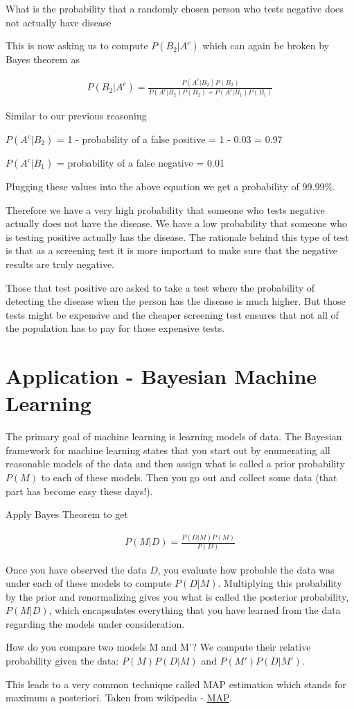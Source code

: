 \documentclass[12pt]{article}
\begin{document}
What is the probability that a randomly chosen person who tests negative does not actually have disease

This is now asking us to compute $P(B_2|A^c)$ which can again be broken by Bayes theorem as 

\begin{align*}
P(B_2|A^c) = \frac{P(A^c|B_2)P(B_2)}{P(A^c|B_2)P(B_2) + P(A^c|B_1)P(B_1)}
\end{align*}

Similar to our previous reasoning

$P(A^c|B_2)$ = 1 - probability of a false positive = 1 - 0.03 = 0.97

$P(A^c|B_1)$ = probability of a false negative = 0.01

Plugging these values into the above equation we get a probability of 99.99\%.

Therefore we have a very high probability that someone who tests negative actually does not have the disease. We have a low probability that someone who is testing positive actually has the disease. The rationale behind this type of test is that as a screening test it is more important to make sure that the negative results are truly negative. 

Those that test positive are asked to take a test where the probability of detecting the disease when the person has the disease is much higher. But those tests might be expensive and the cheaper screening test ensures that not all of the population has to pay for those expensive tests.

\section*{Application - Bayesian Machine Learning}

The primary goal of machine learning is learning models of data. 
The Bayesian framework for machine learning states that you start out by enumerating all reasonable models of the data and then assign what is called a prior probability $P(M)$ to each of these models. Then you go out and collect some data (that part has become easy these days!). 

Apply Bayes Theorem to get

\begin{align*}
P(M|D) = \frac{P(D|M)P(M)}{P(D)}
\end{align*}

Once you have observed the data $D$, you evaluate how probable the data was under each of these models to compute $P(D|M)$. Multiplying this probability by the prior and renormalizing gives you what is called the posterior probability, $P(M|D)$, which encapsulates everything that you have learned from the data regarding the models under consideration. 

How do you compare two models M and M'? We compute their relative probability given the data: $P(M)P(D|M)$ and $P(M')P(D|M')$.

This leads to a very common technique called MAP estimation which stands for maximum a posteriori. Taken from wikipedia - \href{http://en.wikipedia.org/wiki/Maximum_a_posteriori_estimation}{\underline{MAP}}.
\end{document}
